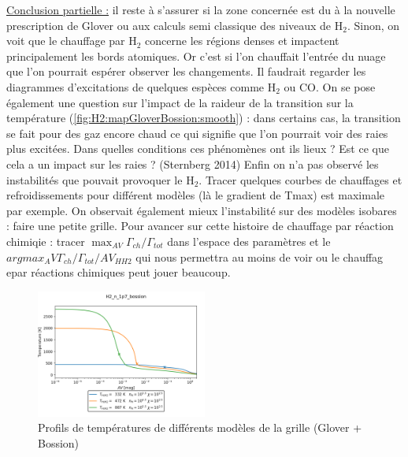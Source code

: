 \underline{Conclusion partielle :} il reste à s'assurer si la zone concernée est du à la nouvelle prescription de Glover ou aux calculs semi classique des niveaux de $\mathrm{H}_2$. Sinon, on voit que le chauffage par $\mathrm{H}_2$ concerne les régions denses et impactent principalement les bords atomiques. Or c'est si l'on chauffait l'entrée du nuage que l'on pourrait espérer observer les changements. Il faudrait regarder les diagrammes d'excitations de quelques espèces comme $\mathrm{H}_2$ ou $\mathrm{CO}$. On se pose également une question sur l'impact de la raideur de la transition sur la température (\autoref{fig:H2:mapGloverBossion:smooth}) : dans certains cas, la transition se fait pour des gaz encore chaud ce qui signifie que l'on pourrait voir des raies plus excitées. Dans quelles conditions ces phénomènes ont ils lieux ? Est ce que cela a un impact sur les raies ? (Sternberg 2014) Enfin on n'a pas observé les instabilités que pouvait provoquer le $\mathrm{H}_2$. Tracer quelques courbes de chauffages et refroidissements pour différent modèles (là le gradient de Tmax) est maximale par exemple. On observait également mieux l'instabilité sur des modèles isobares : faire une petite grille. Pour avancer sur cette histoire de chauffage par réaction chimiqie : tracer $\max_{AV} \Gamma_{ch}/\Gamma_{tot}$ dans l'espace des paramètres et le $argmax_AV  \Gamma_{ch}/\Gamma_{tot}/AV_{HH2}$  qui nous permettra au moins de voir ou le chauffag epar réactions chimiques peut jouer beaucoup. 

\begin{figure}[th!]
        \centering \includegraphics[trim = {0 0 0 0},clip,width=0.5\textwidth]{figure/H2/mapGloverBossion/H2_n_1p7_bossion_d3p5r2p5_d4p5r2p5_d5p5r2p5.png}
        \caption{Profils de températures de différents modèles de la grille (Glover + Bossion)}
        \label{fig:H2:mapGloverBossion:smooth}
\end{figure}

